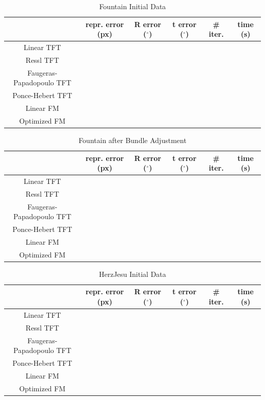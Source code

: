 \begin{table}[htbp]
  \centering
  \caption{Fountain Initial Data}
  \label{tab:fountainInit}
  \begin{tabular}{|*{6}{c}|}
    \hline
     & repr. error (px) & R error ($^{\circ}$) & t error ($^{\circ}$) & \# iter. & time (s)\\
    \hline
    Linear TFT & & & & & \\
    \hline
    Ressl TFT & & & & & \\
    \hline
    Faugeras-Papadopoulo TFT & & & & & \\
    \hline
    Ponce-Hebert TFT & & & & & \\
    \hline
    Linear FM & & & & & \\
    \hline
    Optimized FM & & & & & \\
    \hline
  \end{tabular}
\end{table}

\begin{table}[htbp]
  \centering
  \caption{Fountain after Bundle Adjustment}
  \label{tab:fountainBA}
  \begin{tabular}{|*{6}{c}|}
    \hline
     & repr. error (px) & R error ($^{\circ}$) & t error ($^{\circ}$) & \# iter. & time (s)\\
    \hline
    Linear TFT & & & & & \\
    \hline
    Ressl TFT & & & & & \\
    \hline
    Faugeras-Papadopoulo TFT & & & & & \\
    \hline
    Ponce-Hebert TFT & & & & & \\
    \hline
    Linear FM & & & & & \\
    \hline
    Optimized FM & & & & & \\
    \hline
  \end{tabular}
\end{table}

\begin{table}[htbp]
  \centering
  \caption{HerzJesu Initial Data}
  \label{tab:HerzJesuInit}
  \begin{tabular}{|*{6}{c}|}
    \hline
     & repr. error (px) & R error ($^{\circ}$) & t error ($^{\circ}$) & \# iter. & time (s)\\
    \hline
    Linear TFT & & & & & \\
    \hline
    Ressl TFT & & & & & \\
    \hline
    Faugeras-Papadopoulo TFT & & & & & \\
    \hline
    Ponce-Hebert TFT & & & & & \\
    \hline
    Linear FM & & & & & \\
    \hline
    Optimized FM & & & & & \\
    \hline
  \end{tabular}
\end{table}

